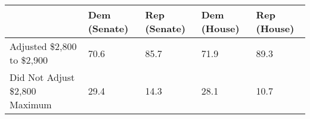 \begin{tabular}{lllll}
  \toprule
  & Dem (Senate) & Rep (Senate) & Dem (House) & Rep (House) \\ 
  \midrule
Adjusted \$2,800 to \$2,900 & 70.6 & 85.7 & 71.9 & 89.3 \\ 
  Did Not Adjust \$2,800 Maximum & 29.4 & 14.3 & 28.1 & 10.7 \\ 
   \bottomrule
\end{tabular}
